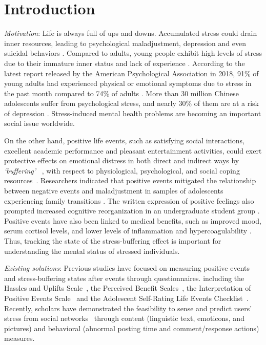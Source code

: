 \documentclass[5p,times,numbers,authoryear]{elsarticle}
\begin{document}
\section{Introduction}
\emph{Motivation}: Life is always full of ups and downs.
Accumulated stress could drain inner resources,
leading to psychological maladjustment, depression and even suicidal behaviors \citep{Nock2008Suicide}.
Compared to adults,
{young people exhibit high levels of stress}
due to their immature inner status and lack of experience \citep{older}.
According to the latest report released by the American Psychological Association in 2018,
91\% of young adults had experienced physical or emotional symptoms due to stress in the past month compared to 74\% of adults \citep{APA2018}.
More than 30 million Chinese adolescents suffer from psychological stress,
and nearly 30\% of them are at a risk of depression \citep{ChinaTeen2019}.
Stress-induced mental health problems are becoming an important social issue worldwide.

On the other hand, positive life events, such as satisfying social interactions,
excellent academic performance and pleasant entertainment activities,
could exert protective effects on emotional distress in both direct and indirect ways by \emph{`buffering'} ~\citep{Shahar2002Positive, Cohen2010Positive},
with respect to physiological, psychological, and social coping resources~\citep{Cohen1984Positive,Needles1990Positive}.
Researchers indicated that positive events mitigated the relationship between negative events and maladjustment in samples of adolescents experiencing family transitions \citep{Doyle2003Positive}.
The written expression of positive feelings also prompted increased cognitive reorganization in an undergraduate student group \citep{Coolidge2009A}.
Positive events have also been linked to medical benefits, such as improved mood, serum cortisol levels, and lower levels of inflammation and hypercoagulability \citep{Caputo1998Influence,Jain2010Effects}.
Thus, tracking the state of the stress-buffering effect is important for understanding the mental status of stressed individuals.

\emph{Existing solutions}:
Previous studies have focused on measuring positive events and stress-buffering states after events through questionnaires.
including the Hassles and Uplifts Scale~\citep{Kanner1981Comparison}, the
Perceived Benefit Scales~\citep{Mcmillen1998The}, the
Interpretation of Positive Events Scale~\citep{Alden2008Social}
and the Adolescent Self-Rating Life Events Checklist~\citep{Jun2008Influence}.
Recently, scholars have demonstrated the feasibility to sense and predict users' stress from social networks~\citep{XueUbicomp13,Xue2014Detecting,Lin2014User,Li2015When,Li2015Predicting,Li2015Using,
Li2017Analyzing,Li2017Exploring}
through content (linguistic text, emoticons, and pictures)
and behavioral (abnormal posting time and comment/response actions) measures.
\end{document}
